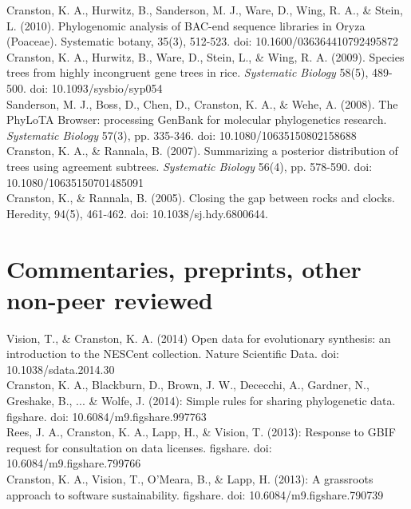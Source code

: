 \documentclass[10pt]{article}
\begin{document}
\noindent Cranston, K. A., Hurwitz, B., Sanderson, M. J., Ware, D., Wing, R. A., \& Stein, L. (2010). Phylogenomic analysis of BAC-end sequence libraries in Oryza (Poaceae). Systematic botany, 35(3), 512-523. doi: 10.1600/036364410792495872\\

\noindent Cranston, K. A., Hurwitz, B., Ware, D., Stein, L., \& Wing, R. A. (2009). Species trees from highly incongruent gene trees in rice.  \textit{Systematic Biology} 58(5), 489-500. doi: 10.1093/sysbio/syp054 \\

\noindent Sanderson, M. J., Boss, D., Chen, D., Cranston, K. A., \& Wehe, A. (2008). The PhyLoTA Browser: processing GenBank for molecular phylogenetics research. \textit{Systematic Biology} 57(3), pp. 335-346. doi: 10.1080/10635150802158688\\

\noindent Cranston, K. A., \& Rannala, B. (2007). Summarizing a posterior distribution of trees using agreement subtrees. \textit{Systematic Biology} 56(4), pp. 578-590. doi: 10.1080/10635150701485091\\

\noindent Cranston, K., \& Rannala, B. (2005). Closing the gap between rocks and clocks. Heredity, 94(5), 461-462. doi: 10.1038/sj.hdy.6800644.

\section*{Commentaries, preprints, other non-peer reviewed}
\noindent Vision, T., \& Cranston, K. A. (2014) Open data for evolutionary synthesis: an introduction to the NESCent collection. Nature Scientific Data. doi: 10.1038/sdata.2014.30  \\

\noindent Cranston, K. A., Blackburn, D., Brown, J. W., Dececchi, A., Gardner, N., Greshake, B., ... \& Wolfe, J. (2014): Simple rules for sharing phylogenetic data. figshare. doi: 10.6084/m9.figshare.997763 \\

\noindent Rees, J. A., Cranston, K. A., Lapp, H., \& Vision, T. (2013): Response to GBIF request for consultation on data licenses. figshare. doi: 10.6084/m9.figshare.799766 \\

\noindent Cranston, K. A., Vision, T., O'Meara, B., \& Lapp, H. (2013): A grassroots approach to software sustainability. figshare.
doi: 10.6084/m9.figshare.790739 \\
\end{document}

